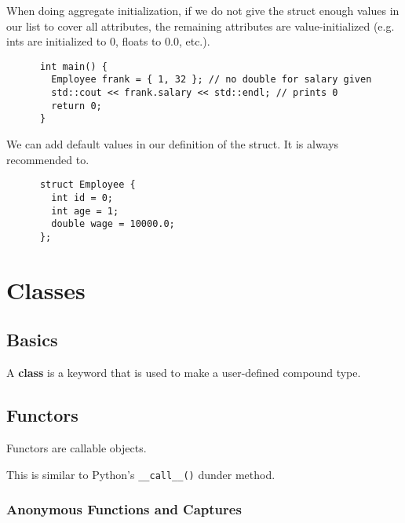 \documentclass{article}
\begin{document}
  \begin{lemma}
    When doing aggregate initialization, if we do not give the struct enough values in our list to cover all attributes, the remaining attributes are value-initialized (e.g. ints are initialized to 0, floats to 0.0, etc.). 
    \begin{lstlisting}
      int main() {
        Employee frank = { 1, 32 }; // no double for salary given 
        std::cout << frank.salary << std::endl; // prints 0
        return 0; 
      }
    \end{lstlisting}
  \end{lemma}

  \begin{lemma}
    We can add default values in our definition of the struct. It is always recommended to. 
    \begin{lstlisting}
      struct Employee {
        int id = 0;
        int age = 1;
        double wage = 10000.0;
      };
    \end{lstlisting}
  \end{lemma}

\section{Classes} 

  \subsection{Basics} 

    \begin{definition}[Class]
      A \textbf{class} is a keyword that is used to make a user-defined compound type. 
    \end{definition}

  \subsection{Functors} 

      \begin{definition}[Functors]
        Functors are callable objects. 
      \end{definition}

      This is similar to Python's \texttt{\_\_call\_\_()} dunder method. 

    \subsubsection{Anonymous Functions and Captures} 
\end{document}
